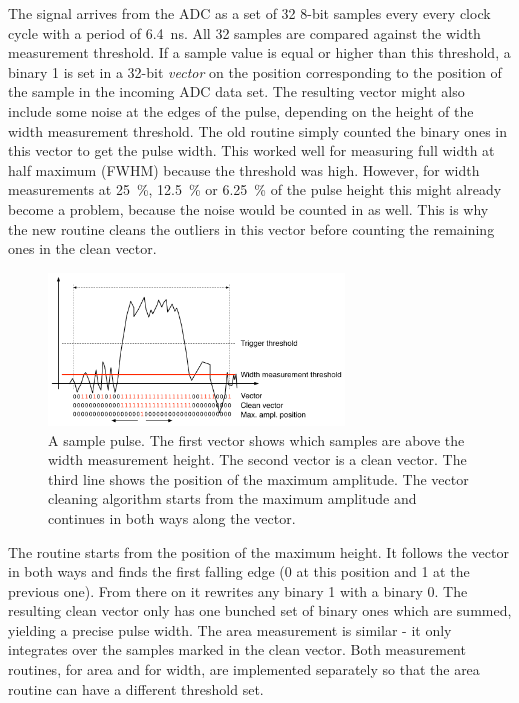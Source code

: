 \documentclass[12pt]{mytustyle}  %
\begin{document}
The signal arrives from the ADC as a set of 32 8-bit samples every every clock cycle with a period of 6.4~ns. All 32 samples are compared against the width measurement threshold. If a sample value is equal or higher than this threshold, a binary 1 is set in a 32-bit \emph{vector} on the position corresponding to the position of the sample in the incoming ADC data set. The resulting vector might also include some noise at the edges of the pulse, depending on the height of the width measurement threshold. The old routine simply counted the binary ones in this vector to get the pulse width. This worked well for measuring full width at half maximum (FWHM) because the threshold was high. However, for width measurements at 25~\%, 12.5~\% or 6.25~\% of the pulse height this might already become a problem, because the noise would be counted in as well. This is why the new routine cleans the outliers in this vector before counting the remaining ones in the clean vector. 

\begin{figure}[!ht]
\centering
\includegraphics[width=0.7\textwidth]{plots/pulse1}
\caption{A sample pulse. The first vector shows which samples are above the width measurement height. The second vector is a clean vector. The third line shows the position of the maximum amplitude. The vector cleaning algorithm starts from the maximum amplitude and continues in both ways along the vector.}
\label{fig:samplepulse}
\end{figure}

The routine starts from the position of the maximum height. It follows the vector in both ways and finds the first falling edge (0 at this position and 1 at the previous one). From there on it rewrites any binary 1 with a binary 0. The resulting clean vector only has one bunched set of binary ones which are summed, yielding a precise pulse width. The area measurement is similar - it only integrates over the samples marked in the clean vector. Both measurement routines, for area and for width, are implemented separately so that the area routine can have a different threshold set.
\end{document}
